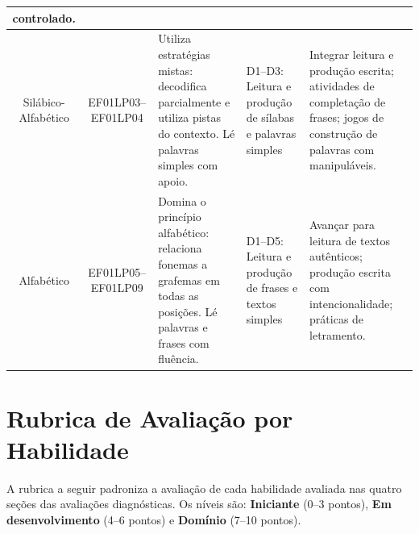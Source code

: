 \begin{table}[h]
\begin{tabular}{|c|c|p{3.2cm}|p{3.8cm}|p{3.8cm}|}
controlado. \\
\hline
\rowcolor{primary!10}
Silábico-Alfabético &
EF01LP03--EF01LP04 &
Utiliza estrat\'{e}gias mistas: decodifica parcialmente e utiliza pistas
do contexto. L\'{e} palavras simples com apoio. &
D1--D3: Leitura e produ\c{c}\~{a}o de s\'{i}labas e palavras simples &
Integrar leitura e produ\c{c}\~{a}o escrita; atividades de
completa\c{c}\~{a}o de frases; jogos de constru\c{c}\~{a}o de palavras
com manipul\'{a}veis. \\
\hline
\rowcolor{success!10}
Alfabético &
EF01LP05--EF01LP09 &
Domina o princ\'{i}pio alfabético: relaciona fonemas a grafemas em
todas as posi\c{c}\~{o}es. L\'{e} palavras e frases com flu\^{e}ncia. &
D1--D5: Leitura e produ\c{c}\~{a}o de frases e textos simples &
Avan\c{c}ar para leitura de textos aut\^{e}nticos; produ\c{c}\~{a}o
escrita com intencionalidade; pr\'{a}ticas de letramento. \\
\hline
\end{tabular}
\end{table}

\section{Rubrica de Avaliação por Habilidade}

A rubrica a seguir padroniza a avalia\c{c}\~{a}o de cada habilidade
avaliada nas quatro se\c{c}\~{o}es das avalia\c{c}\~{o}es diagnósticas.
Os n\'{i}veis s\~{a}o: \textbf{Iniciante} (0--3 pontos),
\textbf{Em desenvolvimento} (4--6 pontos) e \textbf{Dom\'{i}nio} (7--10 pontos).

